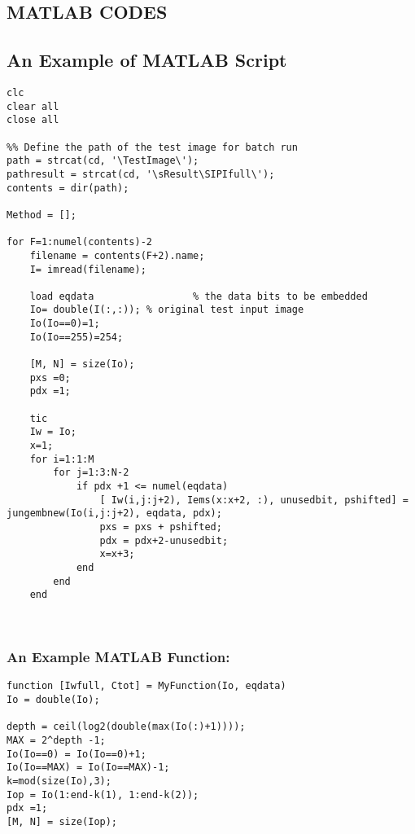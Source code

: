
\begin{appendices}
\raggedbottom

\chapter{MATLAB CODES}
\label{matlab}
\section{An Example of MATLAB Script}

\begin{lstlisting}
clc
clear all
close all

%% Define the path of the test image for batch run
path = strcat(cd, '\TestImage\');
pathresult = strcat(cd, '\sResult\SIPIfull\');
contents = dir(path); 

Method = [];

for F=1:numel(contents)-2
    filename = contents(F+2).name;
    I= imread(filename);
  
    load eqdata  				% the data bits to be embedded
    Io= double(I(:,:)); % original test input image
    Io(Io==0)=1;
    Io(Io==255)=254;
    
    [M, N] = size(Io);
    pxs =0;
    pdx =1;
    
    tic
    Iw = Io;
    x=1;
    for i=1:1:M
        for j=1:3:N-2
            if pdx +1 <= numel(eqdata)
                [ Iw(i,j:j+2), Iems(x:x+2, :), unusedbit, pshifted] = jungembnew(Io(i,j:j+2), eqdata, pdx);
                pxs = pxs + pshifted;
                pdx = pdx+2-unusedbit;
                x=x+3;
            end
        end
    end
    
          

\end{lstlisting}

\vspace{2.5ex}
\subsection{An Example MATLAB Function: }
\begin{lstlisting}
function [Iwfull, Ctot] = MyFunction(Io, eqdata)
Io = double(Io);

depth = ceil(log2(double(max(Io(:)+1))));
MAX = 2^depth -1;
Io(Io==0) = Io(Io==0)+1;
Io(Io==MAX) = Io(Io==MAX)-1;
k=mod(size(Io),3);
Iop = Io(1:end-k(1), 1:end-k(2));
pdx =1;
[M, N] = size(Iop);


\end{lstlisting}
\end{appendices}
